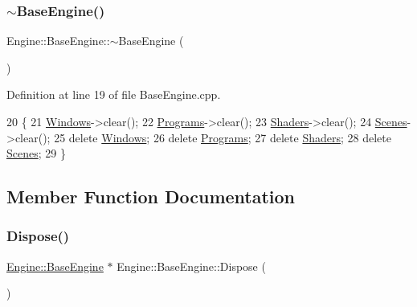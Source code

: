 \subsubsection{\texorpdfstring{$\sim$\+Base\+Engine()}{~BaseEngine()}}
{\footnotesize\ttfamily Engine\+::\+Base\+Engine\+::$\sim$\+Base\+Engine (\begin{DoxyParamCaption}{ }\end{DoxyParamCaption})}



Definition at line 19 of file Base\+Engine.\+cpp.


\begin{DoxyCode}
20 \{
21     \mbox{\hyperlink{classEngine_1_1BaseEngine_a4a1a4c4dae052e66ecc4f326eeed4d33}{Windows}}->clear();
22     \mbox{\hyperlink{classEngine_1_1BaseEngine_ae0f86360ea3a384caefe443dd8f88601}{Programs}}->clear();
23     \mbox{\hyperlink{classEngine_1_1BaseEngine_a2582dee3f73da82bb422b43317b85e3b}{Shaders}}->clear();
24     \mbox{\hyperlink{classEngine_1_1BaseEngine_afd02af3c2fbe9bb734db014dec06585a}{Scenes}}->clear();
25     \textcolor{keyword}{delete} \mbox{\hyperlink{classEngine_1_1BaseEngine_a4a1a4c4dae052e66ecc4f326eeed4d33}{Windows}};
26     \textcolor{keyword}{delete} \mbox{\hyperlink{classEngine_1_1BaseEngine_ae0f86360ea3a384caefe443dd8f88601}{Programs}};
27     \textcolor{keyword}{delete} \mbox{\hyperlink{classEngine_1_1BaseEngine_a2582dee3f73da82bb422b43317b85e3b}{Shaders}};
28     \textcolor{keyword}{delete} \mbox{\hyperlink{classEngine_1_1BaseEngine_afd02af3c2fbe9bb734db014dec06585a}{Scenes}};
29 \}
\end{DoxyCode}


\subsection{Member Function Documentation}
\mbox{\label{classEngine_1_1BaseEngine_acd5cd5d2189d24e038b23477b7dce405}} 
\subsubsection{\texorpdfstring{Dispose()}{Dispose()}}
{\footnotesize\ttfamily \mbox{\hyperlink{classEngine_1_1BaseEngine}{Engine\+::\+Base\+Engine}} $\ast$ Engine\+::\+Base\+Engine\+::\+Dispose (\begin{DoxyParamCaption}{ }\end{DoxyParamCaption})}



